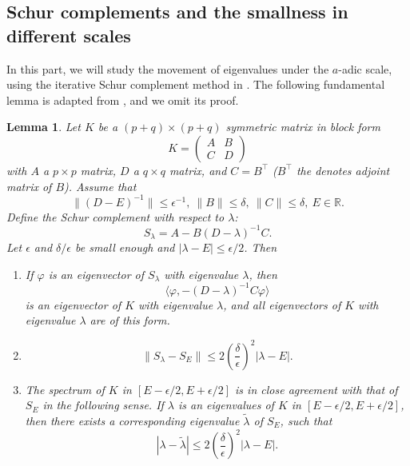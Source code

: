 \documentclass[11pt,reqno,UTF8,twoside]{amsart}
\newcommand{\R}{\mathbb{R}}
\newtheorem{lem}[thm]{Lemma}
\theoremstyle{definition}
\numberwithin{equation}{section}
\begin{document}
\subsection{Schur complements and the smallness in different scales}
In this part, we will study the movement of eigenvalues under the $a$-adic scale, using the iterative Schur complement method in \cite{IM16,Imb21}. The following fundamental lemma is adapted from \cite[Lemma 1.4]{IM16}, and we omit its proof.
\begin{lem}\label{fundamental schur lemma}
Let \( K \) be a \((p+q) \times (p+q)\) symmetric matrix in block form
\[
K = \begin{pmatrix}
A & B \\
C & D
\end{pmatrix}
\]
with \( A \) a \( p \times p \) matrix, \( D \) a \( q \times q \) matrix, and \( C = B^{\top} \) ($B^{\top}$ the denotes adjoint matrix of $B$). 
Assume that 
\[
\|(D - E)^{-1}\| \leq \epsilon^{-1}, \  \|B\| \leq \delta, \  \|C\| \leq \delta,\ E\in\R.
\]
Define the Schur complement with respect to \(\lambda\):
\[
S_\lambda = A - B(D - \lambda)^{-1}C.
\]
Let \(\epsilon\) and \(\delta / \epsilon\) be small enough and \(|\lambda - E| \leq \epsilon / 2\). Then

\begin{enumerate}
    \item[(i)] If \(\varphi\) is an eigenvector of  \(S_\lambda\) with eigenvalue \(\lambda\), then 
    \[
    \langle \varphi, -(D - \lambda)^{-1}C\varphi\rangle
    \]
    is an eigenvector of  \(K\) with eigenvalue \(\lambda\), and all eigenvectors of \(K\) with eigenvalue \(\lambda\) are of this form.
    
    \item[(ii)]
    \[
    \|S_\lambda - S_E\| \leq 2\left(\frac{\delta}{\epsilon}\right)^2 |\lambda - E|.
    \]
    
    \item[(iii)] The spectrum of \(K\) in \([E - \epsilon / 2, E + \epsilon / 2]\) is in close agreement with that of \(S_E\) in the following sense. 
    If $\lambda$ is an eigenvalues of \(K\) in \([E - \epsilon / 2, E + \epsilon / 2]\), 
    then there exists a corresponding eigenvalue $\tilde{\lambda}$ of \(S_E\), such that
    \[
    |\lambda - \tilde{\lambda}| \leq 2(\frac{\delta }{ \epsilon} )^2 |\lambda - E|. 
    \]
\end{enumerate}
\end{lem}
\end{document}
